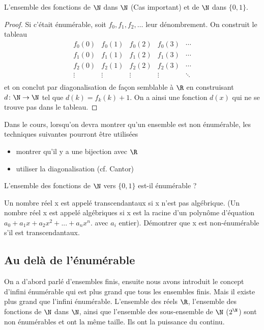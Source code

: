 \begin{myexem}
  \label{exem:fNN}
 L'ensemble des fonctions de $\N$ dans $\N$ (Cas important) et de $\N$ dans $\{0, 1\}$.
 \begin{proof}
   Si c'était énumérable, soit $f_0, f_1, f_2, \ldots$ leur dénombrement.
   On construit le tableau
   \[
     \begin{array}{ccccc}
       f_0(0) & f_0(1) & f_0(2) & f_0(3) & \cdots\\
       f_1(0) & f_1(1) & f_1(2) & f_1(3) & \cdots\\
       f_2(0) & f_2(1) & f_2(2) & f_2(3) & \cdots\\
       \vdots & \vdots & \vdots & \vdots & \ddots\\
     \end{array}
   \]
   et on conclut par diagonalisation de façon semblable à $\R$
   en construisant $d\colon \N \to \N$ tel que $d(k) = f_k(k)+1$.
   On a ainsi une fonction $d(x)$ qui ne se trouve pas dans le tableau.
 \end{proof}
\end{myexem}

Dans le cours, lorsqu'on devra montrer qu'un ensemble est non énumérable,
les techniques suivantes pourront être utilisées
\begin{itemize}
	\item montrer qu'il y a une bijection avec $\R$
	\item utiliser la diagonalisation (cf. Cantor)
\end{itemize}

\begin{myexercice}\label{exerc:conceptfct}
L'ensemble des fonctions de $\N$ vers $\{0,1\}$ est-il énumérable ?
\end{myexercice}


\begin{myexercice} \label{exerc:ensembleNonEnumNumTranscendantaux}
Un nombre réel x est appelé transcendantaux si x n'est pas algébrique. (Un nombre réel x est appelé algébriques si x est la racine d'un polynôme d'équation $a_0 + a_1x + a_2x^2 + ... + a_nx^n$.  avec $a_i$ entier).
Démontrer que x est non-énumérable s'il est transcendantaux.
\end{myexercice}

\subsection{Au delà de l'énumérable}
\label{subsec:au_dela_de_l_enumerable}
On a d'abord parlé d'ensembles finis, ensuite nous avons introduit le concept d'infini
énumérable qui est plus grand que tous les ensembles finis. Mais il existe plus grand
que l'infini énumérable. L'ensemble des réels $\R$, l'ensemble des fonctions de $\N$ dans $\N$, ainsi que
l'ensemble des sous-ensemble de $\N$ ($2^{\N}$) sont non énumérables et ont la même taille. Ils ont la puissance du continu.

